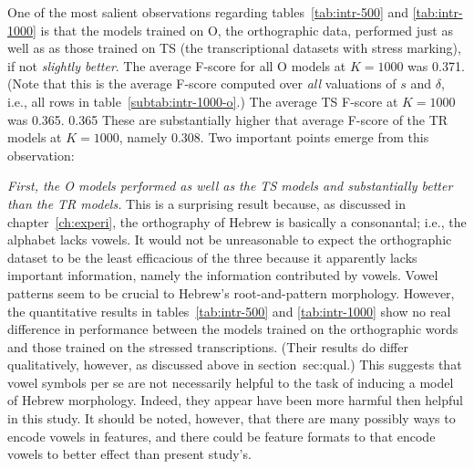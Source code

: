 One of the most salient observations regarding tables~\ref{tab:intr-500} and \ref{tab:intr-1000}
 is that the models trained on O, the orthographic data, performed just as well as as those trained on TS
  (the transcriptional datasets with stress marking), if not \emph{slightly better}. The average F-score for all O models 
 at $K=1000$ was 0.371. (Note that this is the average F-score computed over \emph{all} valuations of $s$
   and $\delta$, i.e., all rows in table~\ref{subtab:intr-1000-o}.) 
   The average TS F-score at $K=1000$ was 0.365. 
   0.365  
   These are substantially higher that average F-score of the TR models at $K=1000$, namely 0.308.
  Two important points emerge from this observation: 


\emph{First, the O models performed as well as the TS models and substantially better than the
  TR models.} 
 This is a surprising result because, as discussed in chapter~\ref{ch:experi}, 
 the orthography of Hebrew is basically a consonantal; i.e., the alphabet lacks vowels. 
It would not be unreasonable to expect the orthographic dataset to be the least efficacious of the three because it
apparently lacks important information, namely the information contributed by vowels. Vowel patterns seem to be crucial to Hebrew's 
root-and-pattern morphology. However, the quantitative results in tables~\ref{tab:intr-500} and \ref{tab:intr-1000} 
show no real difference in performance between the models trained on the orthographic words and those trained on the stressed transcriptions. 
(Their results do differ qualitatively, however, as discussed above in section~{sec:qual}.) 
This suggests that vowel symbols per se are not necessarily 
helpful to the task of inducing a model of Hebrew morphology. Indeed, 
they appear have been more harmful then helpful in this study. It should be 
noted, however, that there are many possibly ways to encode vowels in features, and 
there could be feature formats to that encode vowels to better effect than present study's.

